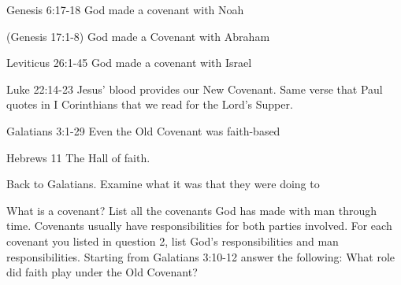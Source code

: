 \begin{discussion}



Genesis 6:17-18  God made a covenant with Noah

(Genesis 17:1-8) God made a Covenant with Abraham

Leviticus 26:1-45 God made a covenant with Israel

Luke 22:14-23 Jesus' blood provides our New Covenant.  Same verse that Paul quotes in I Corinthians that we read for the Lord's Supper.



Galatians 3:1-29 Even the Old Covenant was faith-based

Hebrews 11 The Hall of faith.


Back to Galatians.  Examine what it was that they were doing to 

\end{discussion}

\begin{questions}
\q What is a covenant?
\q List all the covenants God has made with man through time.
\q Covenants usually have responsibilities for both parties involved.  For each covenant you listed in question 2, list God's responsibilities and man responsibilities.
\q Starting from Galatians 3:10-12 answer the following:  What role did faith play under the Old Covenant?
\end{questions}